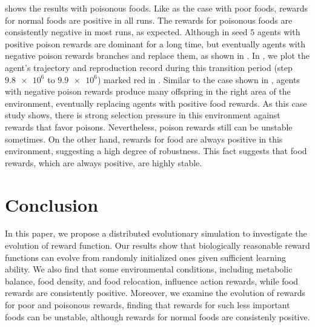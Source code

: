  shows the results with poisonous foods. Like as the case with poor foods, rewards for normal foods are positive in all runs. The rewards for poisonous foods are consistently negative in most runs, as expected. Although in seed $5$ agents with positive poison rewards are dominant for a long time, but eventually agents with negative poison rewards branches and replace them, as shown in . In , we plot the agent's trajectory and reproduction record during this transition period (step $\num{9.8e6}$ to $\num{9.9e6}$) marked red in . Similar to the case shown in , agents with negative poison rewards produce many offspring in the right area of the environment, eventually replacing agents with positive food rewards. As this case study shows, there is strong selection pressure in this environment against rewards that favor poisons. Nevertheless, poison rewards still can be unstable sometimes. On the other hand, rewards for food are always positive in this environment, suggesting a high degree of robustness. This fact suggests that food rewards, which are always positive, are highly stable.

\section{Conclusion}
In this paper, we propose a distributed evolutionary simulation to investigate the evolution of reward function.
Our results show that biologically reasonable reward functions can evolve from randomly initialized ones given sufficient learning ability.
We also find that some environmental conditions, including metabolic balance, food density, and food relocation, influence action rewards, while food rewards are consistently positive.
Moreover, we examine the evolution of rewards for poor and poisonous rewards, finding that rewards for such less important foods can be unstable, although rewards for normal foods are consistenly positive.
